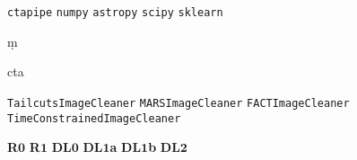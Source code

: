 \NewDocumentCommand \ctapipe {} {\texttt{ctapipe}}
\NewDocumentCommand \numpy {} {\texttt{numpy}}
\NewDocumentCommand \astropy {} {\texttt{astropy}}
\NewDocumentCommand \scipy {} {\texttt{scipy}}
\NewDocumentCommand \sklearn {} {\texttt{sklearn}}

\let\textd\d
\RenewDocumentCommand \d {m} {\TextOrMath{\textd{#1}}{\mathinner{\symup{d}#1}}}

\NewDocumentCommand \cta {} {\gls{cta}}

\NewDocumentCommand \tailcuts {} {\texttt{TailcutsImageCleaner}}
\NewDocumentCommand \mars {} {\texttt{MARSImageCleaner}}
\NewDocumentCommand \fact {} {\texttt{FACTImageCleaner}}
\NewDocumentCommand \tcc {} {\texttt{TimeConstrainedImageCleaner}}

\NewDocumentCommand \rzero {} {\textbf{R}\(\mathbf{0}\)}
\NewDocumentCommand \rone {} {\textbf{R}\(\mathbf{1}\)}
\NewDocumentCommand \dlz {} {\textbf{DL}\(\mathbf{0}\)}
\NewDocumentCommand \dloa {} {\textbf{DL}\(\mathbf{1}\)\textbf{a}}
\NewDocumentCommand \dlob {} {\textbf{DL}\(\mathbf{1}\)\textbf{b}}
\NewDocumentCommand \dlt {} {\textbf{DL}\(\mathbf{2}\)}
